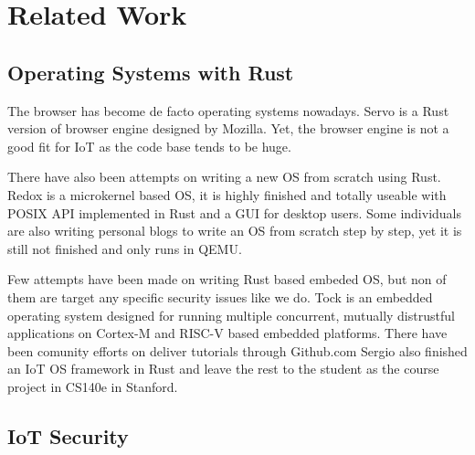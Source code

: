 \section{Related Work}

\subsection{Operating Systems with Rust}

The browser has become de facto operating systems nowadays.
Servo\cite{Servo} is a Rust version of browser engine designed by Mozilla.
Yet, the browser engine is not a good fit for IoT as the code base tends to be huge.

There have also been attempts on writing a new OS from scratch using Rust.
Redox\cite{Redox} is a microkernel based OS, it is highly finished and totally useable with POSIX API implemented in Rust and a GUI for desktop users.
Some individuals are also writing personal blogs\cite{OsPhil} to write an OS from scratch step by step, yet it is still not finished and only runs in QEMU. 

Few attempts have been made on writing Rust based embeded OS, but non of them are target any specific security issues like we do.
Tock\cite{levy2015ownership, levy2017tock, levy2017multiprogramming} is an embedded operating system designed for running multiple concurrent, mutually distrustful applications on Cortex-M and RISC-V based embedded platforms.
There have been comunity efforts on deliver tutorials through Github.com\cite{rpi-os-t0, rpi-os-t1}
Sergio also finished an IoT OS framework in Rust\cite{cs140e} and leave the rest to the student as the course project in CS140e in Stanford.

\subsection{IoT Security}

